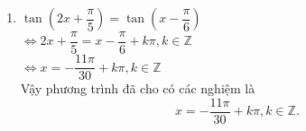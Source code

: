 \begin{bt}
{\begin{enumerate}
        $\Leftrightarrow \hoac{
            &x=k2\pi \\
            &5x=k2\pi}\left(k\in \mathbb{Z}\right)$\\
        $\Leftrightarrow \hoac{
            &x=k2\pi \\
            &x=k\dfrac{2\pi}{5}}\left(k\in \mathbb{Z}\right)$
        \item $ \tan\left(2x+\dfrac{\pi}{5}\right)= \tan\left(x-\dfrac{\pi}{6}\right)$\\
        $\Leftrightarrow 2x+\dfrac{\pi}{5}=x-\dfrac{\pi}{6}+k\pi,k\in \mathbb{Z}$\\
        $\Leftrightarrow x=-\dfrac{11\pi}{30}+k\pi,k\in \mathbb{Z}$\\
        Vậy phương trình đã cho có các nghiệm là  $$x=-\dfrac{11\pi}{30}+k\pi,k\in \mathbb{Z}.$$
    \end{enumerate}}
\end{bt}

